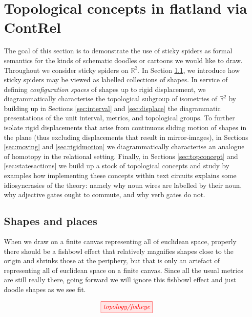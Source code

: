 \section{Topological concepts in flatland via \textbf{ContRel}}

The goal of this section is to demonstrate the use of sticky spiders as formal semantics for the kinds of schematic doodles or cartoons we would like to draw. Throughout we consider sticky spiders on $\mathbb{R}^2$. In Section \ref{sec:shapes}, we introduce how sticky spiders may be viewed as labelled collections of shapes. In service of defining \emph{configuration spaces} of shapes up to rigid displacement, we diagrammatically characterise the topological subgroup of isometries of $\mathbb{R}^2$ by building up in Sections \ref{sec:interval} and \ref{sec:displace} the diagrammatic presentations of the unit interval, metrics, and topological groups. To further isolate rigid displacements that arise from continuous sliding motion of shapes in the plane (thus excluding displacements that result in mirror-images), in Sections \ref{sec:moving} and \ref{sec:rigidmotion} we diagrammatically characterise an analogue of homotopy in the relational setting. Finally, in Sections \ref{sec:topconcept} and \ref{sec:statesactions} we build up a stock of topological concepts and study by examples how implementing these concepts within text circuits explains some idiosyncrasies of the theory: namely why noun wires are labelled by their noun, why adjective gates ought to commute, and why verb gates do not.

\subsection{Shapes and places}\label{sec:shapes}

\begin{remark}
When we draw on a finite canvas representing all of euclidean space, properly there should be a fishbowl effect that relatively magnifies shapes close to the origin and shrinks those at the periphery, but that is only an artefact of representing all of euclidean space on a finite canvas. Since all the usual metrics are still really there, going forward we will ignore this fishbowl effect and just doodle shapes as we see fit.

\[\tikzfig{topology/fisheye}\]
\end{remark}

\newpage

